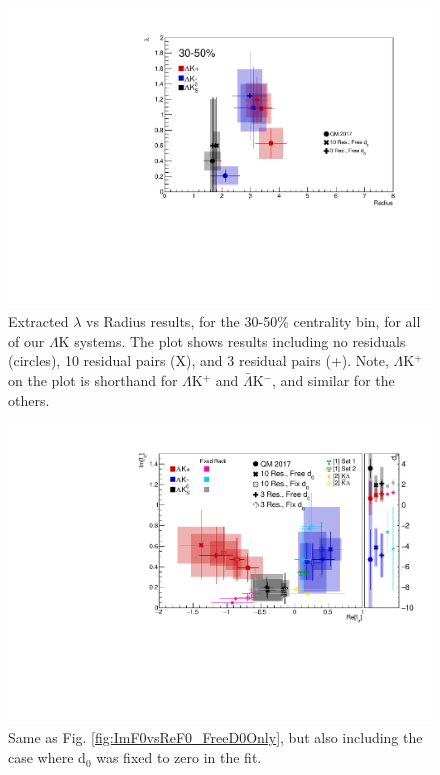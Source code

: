 \documentclass[../AnalysisNoteJBuxton.tex]{subfiles}
\begin{document}
\begin{figure}[h]
  \centering
  \includegraphics[width=\textwidth]{7_ResultsAndDiscussion/Figures/CompareAllRadiusvsLambdaAcrossAnalyses_3050_10ResAnd3Res_10and3SeparateOnly_FreeD0Only.pdf}
  \caption[$\lambda$ vs. R (30-50\% Centrality)]{Extracted $\lambda$ vs Radius results, for the 30-50\% centrality bin, for all of our $\Lambda$K systems.  The plot shows results including no residuals (circles), 10 residual pairs (X), and 3 residual pairs (+).  Note, $\Lambda$K$^{+}$ on the plot is shorthand for $\Lambda$K$^{+}$ and $\bar{\Lambda}$K$^{-}$, and similar for the others.}
  \label{fig:LambdavsR_3050_FreeD0Only}
\end{figure}










\begin{figure}[h]
  \centering
  \includegraphics[width=\textwidth]{7_ResultsAndDiscussion/Figures/CompareAllReF0vsImF0AcrossAnalyses_10ResAnd3Res_10and3SeparateOnly_FreeAndFixedD0_wFixedRadiiResults_wScattLenPredictions.pdf}
  \caption[Scattering Parameter Results (free and fixed d$_{0}$)]{Same as Fig. \ref{fig:ImF0vsReF0_FreeD0Only}, but also including the case where d$_{0}$ was fixed to zero in the fit.}
  \label{fig:ImF0vsReF0_FreeAndFixedD0}
\end{figure}
\end{document}
